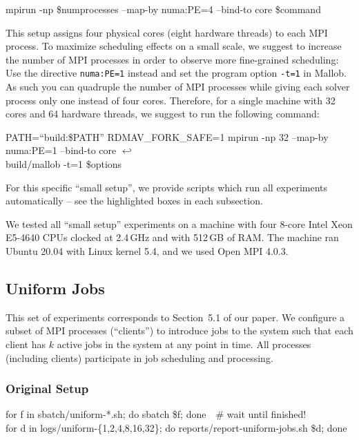 \documentclass[runningheads]{article}
\newcommand{\CR}{{\tiny$\hookleftarrow$}}
\numberwithin{dummy}{subsection}
\begin{document}
\begin{ttfenv}
mpirun -np \$numprocesses --map-by numa:PE=4 --bind-to core \$command
\end{ttfenv}

This setup assigns four physical cores (eight hardware threads) to each MPI process.
To maximize scheduling effects on a small scale, we suggest to increase the number of MPI processes in order to observe more fine-grained scheduling: 
Use the directive \texttt{numa:PE=1} instead and set the program option \texttt{-t=1} in Mallob.
As such you can quadruple the number of MPI processes while giving each solver process only one instead of four cores.
Therefore, for a single machine with 32 cores and 64 hardware threads, we suggest to run the following command:

\begin{ttfenv}
PATH=``build:\$PATH'' RDMAV\_FORK\_SAFE=1 mpirun -np 32 --map-by numa:PE=1 --bind-to core \CR\\
build/mallob -t=1 \$options
\end{ttfenv}

For this specific ``small setup'', we provide scripts which run all experiments automatically -- see the highlighted boxes in each subsection.

We tested all ``small setup'' experiments on a machine with four 8-core Intel Xeon E5-4640 CPUs clocked at 2.4\,GHz and with 512\,GB of RAM.
The machine ran Ubuntu 20.04 with Linux kernel 5.4, and we used Open MPI 4.0.3.








\subsection{Uniform Jobs}
\label{sec:uniform-jobs}

This set of experiments corresponds to Section~5.1 of our paper.
We configure a subset of MPI processes (``clients'') to introduce jobs to the system such that each client has $k$ active jobs in the system at any point in time.
All processes (including clients) participate in job scheduling and processing.

\subsubsection{Original Setup}

\begin{tcolorbox}[
  colback=Magenta!5!white,
  colframe=Magenta!75!black,
  title={\centering Commands for Original Setup}]
\begin{ttfenvcompact}
for f in sbatch/uniform-*.sh; do sbatch \$f; done\ \ \# wait until finished!\\
for d in logs/uniform-\{1,2,4,8,16,32\}; do reports/report-uniform-jobs.sh \$d; done
\end{ttfenvcompact}
\end{tcolorbox}
\end{document}
